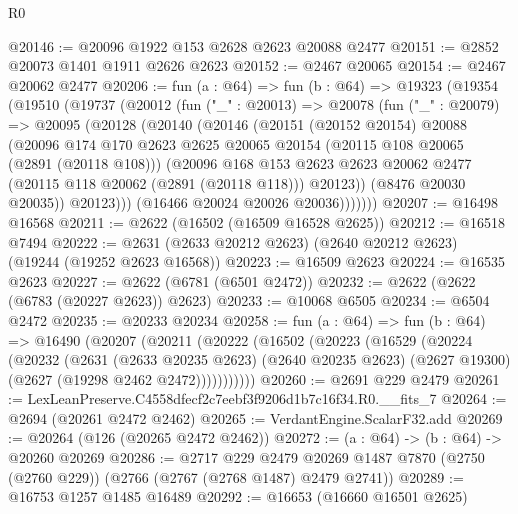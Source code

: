 \begin{lexlean}{R0}
\begin{coremodule}
@20146 := @20096 @1922 @153 @2628 @2623 @20088 @2477
@20151 := @2852 @20073 @1401 @1911 @2626 @2623
@20152 := @2467 @20065
@20154 := @2467 @20062 @2477
@20206 := fun (a : @64) =>
  fun (b : @64) =>
  @19323
    (@19354
      (@19510
        (@19737
          (@20012
            (fun ("_" : @20013) =>
            @20078
              (fun ("_" : @20079) =>
              @20095
                (@20128
                  (@20140
                    (@20146
                      (@20151
                        (@20152 @20154)
                        @20088
                        (@20096
                          @174
                          @170
                          @2623
                          @2625
                          @20065
                          @20154
                          (@20115 @108 @20065 (@2891 (@20118 @108)))
                          (@20096
                            @168
                            @153
                            @2623
                            @2623
                            @20062
                            @2477
                            (@20115 @118 @20062 (@2891 (@20118 @118)))
                            @20123))
                        (@8476 @20030 @20035))
                      @20123)))
                (@16466 @20024 @20026 @20036)))))))
@20207 := @16498 @16568
@20211 := @2622 (@16502 (@16509 @16528 @2625))
@20212 := @16518 @7494
@20222 := @2631 (@2633 @20212 @2623) (@2640 @20212 @2623) (@19244 (@19252 @2623 @16568))
@20223 := @16509 @2623
@20224 := @16535 @2623
@20227 := @2622 (@6781 (@6501 @2472))
@20232 := @2622 (@2622 (@6783 (@20227 @2623)) @2623)
@20233 := @10068 @6505
@20234 := @6504 @2472
@20235 := @20233 @20234
@20258 := fun (a : @64) =>
  fun (b : @64) =>
  @16490
    (@20207
      (@20211
        (@20222
          (@16502
            (@20223
              (@16529
                (@20224
                  (@20232
                    (@2631
                      (@2633 @20235 @2623)
                      (@2640 @20235 @2623)
                      (@2627 @19300)
                      (@2627 (@19298 @2462 @2472)))))))))))
@20260 := @2691 @229 @2479
@20261 := LexLeanPreserve.C4558dfecf2c7eebf3f9206d1b7c16f34.R0.__fits_7
@20264 := @2694 (@20261 @2472 @2462)
@20265 := VerdantEngine.ScalarF32.add
@20269 := @20264 (@126 (@20265 @2472 @2462))
@20272 := (a : @64) -> (b : @64) -> @20260 @20269
@20286 := @2717
    @229
    @2479
    @20269
    @1487
    @7870
    (@2750 (@2760 @229))
    (@2766 (@2767 (@2768 @1487) @2479 @2741))
@20289 := @16753 @1257 @1485 @16489
@20292 := @16653 (@16660 @16501 @2625)

\end{coremodule}
\end{lexlean}
